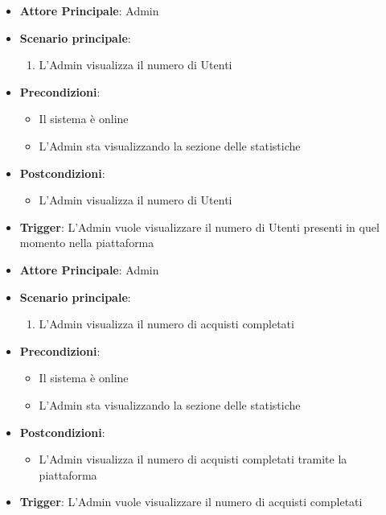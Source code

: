 \label{uc_40.1}

\begin{itemize}
    \item \textbf{Attore Principale}: Admin
	\item \textbf{Scenario principale}:
	\begin{enumerate}
		\item L'Admin visualizza il numero di Utenti
	\end{enumerate}
	\item \textbf{Precondizioni}:
	\begin{itemize}
		\item Il sistema è online
		\item L'Admin sta visualizzando la sezione delle statistiche
	\end{itemize}
	\item \textbf{Postcondizioni}:
	\begin{itemize}
		\item L'Admin visualizza il numero di Utenti
	\end{itemize}
	\item \textbf{Trigger}: L'Admin vuole visualizzare il numero di Utenti presenti in quel momento nella piattaforma
\end{itemize}

\label{uc_40.2}

\begin{itemize}
    \item \textbf{Attore Principale}: Admin
	\item \textbf{Scenario principale}:
	\begin{enumerate}
		\item L'Admin visualizza il numero di acquisti completati
	\end{enumerate}
	\item \textbf{Precondizioni}:
	\begin{itemize}
		\item Il sistema è online
		\item L'Admin sta visualizzando la sezione delle statistiche
	\end{itemize}
	\item \textbf{Postcondizioni}:
	\begin{itemize}
		\item L'Admin visualizza il numero di acquisti completati tramite la piattaforma
	\end{itemize}
	\item \textbf{Trigger}: L'Admin vuole visualizzare il numero di acquisti completati
\end{itemize}

